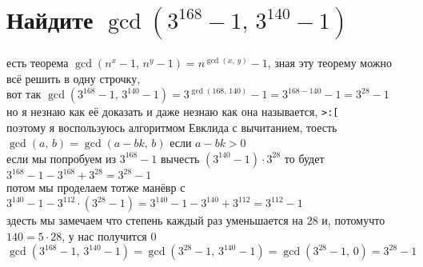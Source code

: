 \documentclass{article}
\begin{document}
  \section{Найдите $\gcd(3^{168}-1,\, 3^{140}-1)$}
  есть теорема $ \gcd(n^x-1,\, n^y-1) = n^{\gcd(x,\, y)}-1 $,
  зная эту теорему можно всё решить в одну строчку, \\
  вот так $\gcd(3^{168}-1,\, 3^{140}-1) = 3^{\gcd(168,\, 140)}-1 = 3^{168-140}-1 = 3^{28}-1$ \\
  но я незнаю как её доказать и даже незнаю как она называется, \texttt{>:[} \\
  поэтому я воспользуюсь алгоритмом Евклида с вычитанием, тоесть $\gcd(a,\, b) = \gcd(a-bk,\, b)$ если $a-bk > 0$ \\
  если мы попробуем из $3^{168}-1$ вычесть $(3^{140}-1) \cdot 3^{28}$ то будет $3^{168}-1 - 3^{168}+3^{28} = 3^{28}-1$ \\
  потом мы проделаем тотже манёвр с $3^{140}-1 - 3^{112} \cdot (3^{28}-1) = 3^{140}-1 - 3^{140}+3^{112} = 3^{112}-1$ \\
  здесть мы замечаем что степень каждый раз уменьшается на $28$ и, потомучто $140 = 5 \cdot 28$, у нас получится $0$ \\
  $\gcd(3^{168}-1,\, 3^{140}-1) = \gcd(3^{28}-1,\, 3^{140}-1) = \gcd(3^{28}-1,\, 0) = 3^{28}-1$

  \pagebreak
\end{document}
